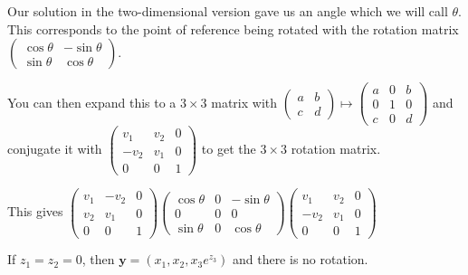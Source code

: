 \documentclass[12pt]{amsart}
\newcommand{\mat}[4]{\left(\begin{array}{ccc} #1 & #2 \\#3 & #4 \end{array} \right)}
\newcommand{\matc}[9]{\left(\begin{array}{ccc} #1 & #2 & #3 \\#4 & #5 & #6 \\#7 & #8 & #9 \end{array} \right)}
\begin{document}
Our solution in the two-dimensional version gave us an angle which we will call $\theta$. This corresponds to the point of reference being rotated with the rotation matrix $\mat{\cos\theta}{-\sin\theta}{\sin\theta}{\cos\theta}$.

You can then expand this to a $3 \times 3$ matrix with $\mat{a}{b}{c}{d} \mapsto \matc{a}{0}{b}{0}{1}{0}{c}{0}{d}$ and conjugate it with $\matc{v_1}{v_2}{0}{-v_2}{v_1}{0}{0}{0}{1}$ to get the $3 \times 3$ rotation matrix.

This gives $\matc{v_1}{-v_2}{0}{v_2}{v_1}{0}{0}{0}{1} \matc{\cos\theta}{0}{-\sin\theta}{0}{0}{0}{\sin\theta}{0}{\cos\theta} \matc{v_1}{v_2}{0}{-v_2}{v_1}{0}{0}{0}{1}$


If $z_1 = z_2 = 0$, then $\textbf{y} = (x_1,x_2,x_3 e^{z_3})$ and there is no rotation.
\end{document}
